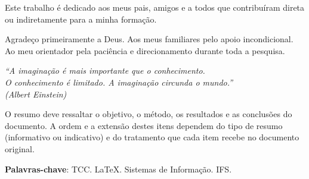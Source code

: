 \begin{dedicatoria}
   \vspace*{\fill}
   \begin{flushright}
   \noindent
   Este trabalho é dedicado aos meus pais, amigos e a todos 
   que contribuíram direta ou indiretamente para a minha formação.
   \end{flushright}
\end{dedicatoria}

\begin{agradecimentos}
Agradeço primeiramente a Deus.
Aos meus familiares pelo apoio incondicional.
Ao meu orientador pela paciência e direcionamento durante toda a pesquisa.
\end{agradecimentos}

\begin{epigrafe}
    \vspace*{\fill}
    \begin{flushright}
    \textit{``A imaginação é mais importante que o conhecimento.\\
    O conhecimento é limitado. A imaginação circunda o mundo.''\\
    (Albert Einstein)}
    \end{flushright}
\end{epigrafe}

\begin{resumo}
    \noindent
    O resumo deve ressaltar o objetivo, o método, os resultados e as conclusões do documento. A ordem e a extensão destes itens dependem do tipo de resumo (informativo ou indicativo) e do tratamento que cada item recebe no documento original.
    
    \vspace{\onelineskip}
    \noindent
    \textbf{Palavras-chave}: %
    TCC. LaTeX. Sistemas de Informação. IFS.
\end{resumo}

